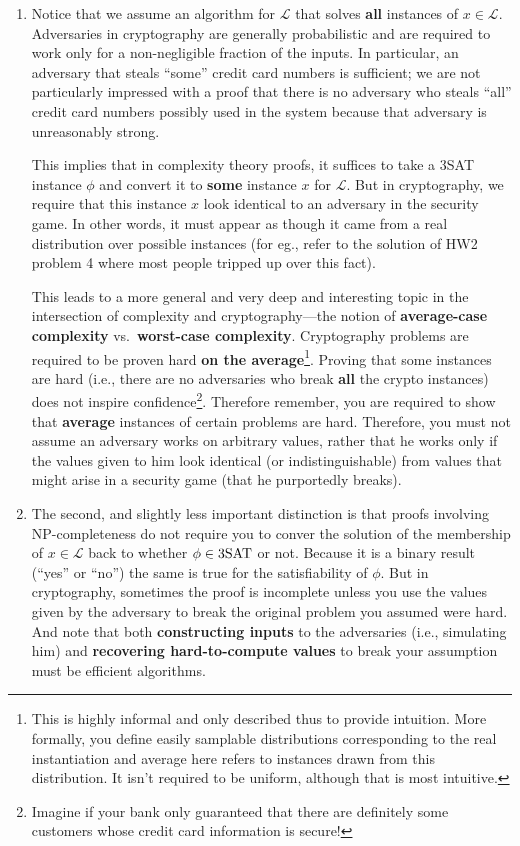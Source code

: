 \documentclass[A4, 11pt]{article}
\renewcommand{\L}{\ensuremath{\mathcal{L}}}
\begin{document}
\begin{enumerate}
\item Notice that we assume an algorithm for $\L$ that solves {\bf all}
instances of $x \in \L$. Adversaries in cryptography are generally
probabilistic and are required to work only for a non-negligible fraction
of the inputs. In particular, an adversary that steals ``some'' credit card
numbers is sufficient; we are not particularly impressed with a proof that
there is no adversary who steals ``all'' credit card numbers possibly used
in the system because that adversary is unreasonably strong. 

This implies that in complexity theory proofs, it suffices to take a 3SAT
instance $\phi$ and convert it to {\bf some} instance $x$ for $\L$. But in
cryptography, we require that this instance $x$ look identical to an
adversary in the security game. In other words, it must appear as though it
came from a real distribution over possible instances (for eg., refer to
the solution of HW2 problem 4 where most people tripped up over this fact). 

\par
This leads to a more general and very deep and interesting topic in the
intersection of complexity and cryptography---the notion of {\bf
average-case complexity} vs.~{\bf worst-case complexity}. Cryptography
problems are required to be proven hard {\bf on the average}\footnote{This
is highly informal and only described thus to provide intuition. More
formally, you define easily samplable distributions corresponding to the
real instantiation and average here refers to instances drawn from this
distribution. It isn't required to be uniform, although that is most
intuitive.}. Proving that some instances are hard (i.e., there are no
adversaries who break {\bf all} the crypto instances) does not inspire
confidence\footnote{Imagine if your bank only guaranteed that there are
definitely some customers whose credit card information is secure!}.
Therefore remember, you are required to show that {\bf average} instances
of certain problems are hard. Therefore, you must not assume an adversary
works on arbitrary values, rather that he works only if the values given to
him look identical (or indistinguishable) from values that might arise in a
security game (that he purportedly breaks).

\item The second, and slightly less important distinction is that proofs
involving NP-completeness do not require you to conver the solution of the
membership of $x \in \L$ back to whether $\phi \in {\rm 3SAT}$ or not.
Because it is a binary result (``yes'' or ``no'') the same is true for the
satisfiability of $\phi$. But in cryptography, sometimes the proof is
incomplete unless you use the values given by the adversary to break the
original problem you assumed were hard. And note that both {\bf
constructing inputs} to the adversaries (i.e., simulating him) and {\bf
recovering hard-to-compute values} to break your assumption must be
efficient algorithms. 


\end{enumerate}
\end{document}
